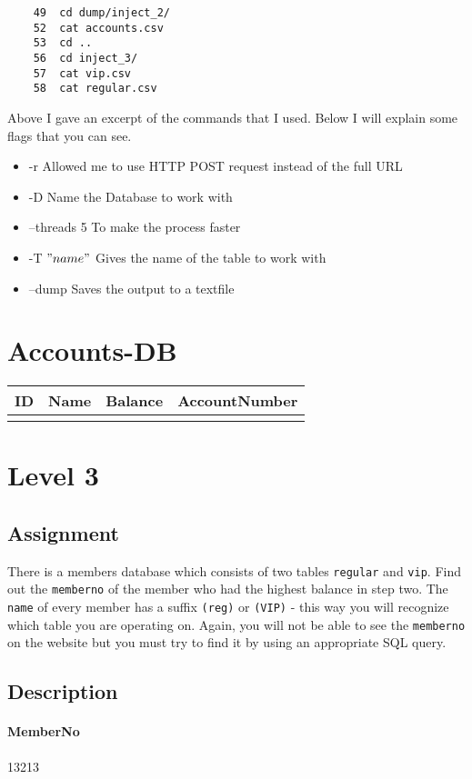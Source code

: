 \documentclass{scrartcl}
\newcommand\solution[2]{{\paragraph{#1}#2}}
\begin{document}
	\begin{lstlisting}
	49  cd dump/inject_2/
	52  cat accounts.csv 
	53  cd ..
	56  cd inject_3/
	57  cat vip.csv
	58  cat regular.csv 
	\end{lstlisting}
	
	
	Above I gave an excerpt of the commands that I used. Below I will explain some flags that you can see.
	
	\begin{itemize}
		\item -r 			Allowed me to use HTTP POST request instead of the full URL
		\item -D			Name the Database to work with
		\item --threads 5	To make the process faster
		\item -T $"name"$	Gives the name of the table to work with
		\item --dump		Saves the output to a textfile
	\end{itemize}	
	
	\section*{Accounts-DB}
	\begin{tabular}[H]{|r|l|r|c|}
		\bfseries ID & \bfseries Name & \bfseries Balance & \bfseries AccountNumber
		\csvreader[head to column names]{accounts.csv}{}	
		{\\ \hline\id  & \name & \balance & \accountno} 
	\end{tabular}
	
	

	
	
	\section*{Level 3}
	\subsection*{Assignment}
	There is a members database which consists of two tables \texttt{regular} and
	\texttt{vip}. Find out the \texttt{memberno} of the member who had the highest
	balance in step two. The \texttt{name} of every member has a suffix
	\texttt{(reg)} or \texttt{(VIP)} - this way you will recognize which table you are operating on. Again, you will
	not be able to see the \texttt{memberno} on the website but you must try to find it by
	using an appropriate SQL query.
	
	\subsection*{Description}
	\solution{MemberNo}{13213}
	
\end{document}
